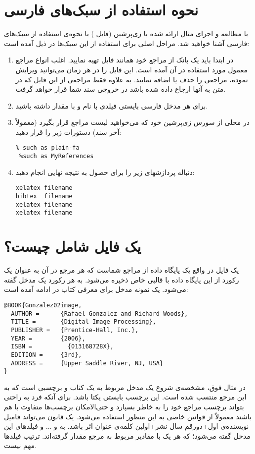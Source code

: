 \documentclass[11pt,a4paper]{article}
\theoremstyle{plain} \newtheorem{question}{پرسش}%
\begin{document}
\section{ نحوه استفاده از سبک‌های فارسی}
 با مطالعه و اجرای مثال ارائه شده با زی‌پرشین (فایل )  با نحوه‌ی استفاده از سبک‌های فارسی آشنا خواهید شد. مراحل اصلی 
 برای استفاده از این سبک‌ها در ذیل آمده است:
\begin{enumerate}
\item در ابتدا باید یک بانک از مراجع خود همانند فایل  تهیه نمایید. اغلب انواع مراجع معمول مورد استفاده در آن آمده است. این فایل 
را در هر زمان می‌توانید ویرایش نموده، مراجعی را حذف یا اضافه نمایید. به علاوه فقط مراجعی از این فایل که در متن به آنها ارجاع داده شده باشد در خروجی 
سند شما قرار خواهد گرفت.
\item برای هر مدخل فارسی بایستی فیلدی با نام  و با مقدار  داشته باشید.
\item در محلی از سورس زی‌پرشین خود که می‌خواهید لیست مراجع قرار بگیرد (معمولاً آخر سند) دستورات زیر را قرار دهید:
\Roman
\begin{verbatim}
% such as plain-fa 
 %such as MyReferences
\end{verbatim}
\Persian
\item دنباله پردازشهای زیر را برای حصول به نتیجه نهایی انجام دهید:
\Roman
\begin{verbatim}
xelatex filename  
bibtex  filename  
xelatex filename  
xelatex filename  
\end{verbatim}
\Persian
\end{enumerate}

\section{یک فایل  شامل چیست؟}
یک فایل  در واقع یک پایگاه داده از مراجع  شماست که هر مرجع در آن به عنوان یک رکورد از این پایگاه داده
با قالبی خاص ذخیره می‌شود. به هر رکورد یک مدخل گفته می‌شود. یک نمونه مدخل برای معرفی کتاب  در ادامه آمده است:
\Roman
\begin{verbatim}
@BOOK{Gonzalez02image,
  AUTHOR =      {Rafael Gonzalez and Richard Woods},
  TITLE =       {Digital Image Processing},
  PUBLISHER =   {Prentice-Hall, Inc.},
  YEAR =        {2006},
  ISBN = 	      {013168728X},
  EDITION =     {3rd},
  ADDRESS =     {Upper Saddle River, NJ, USA}
}
\end{verbatim}
\Persian
در مثال فوق،  مشخصه‌ی شروع یک مدخل مربوط به یک کتاب و  برچسبی است که به این مرجع منتسب شده است.
 این برچسب بایستی یکتا باشد. برای آنکه فرد به راحتی بتواند برچسب
مراجع خود را به خاطر بسپارد و حتی‌الامکان برچسب‌ها متفاوت با هم باشند معمولاً از قوانین خاصی به این منظور استفاده می‌شود. یک قانون می‌تواند فامیل نویسنده‌ی
اول+دورقم سال نشر+اولین کلمه‌ی عنوان اثر باشد. به  و $\dots$ و  فیلدهای این مدخل گفته می‌شود؛ که هر یک با مقادیر مربوط
به مرجع مقدار گرفته‌اند. ترتیب فیلدها مهم نیست. 
\end{document}
